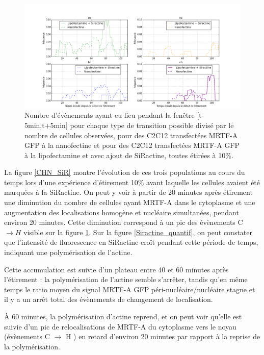 \begin{figure}
\includegraphics[scale=0.3]{Figures/Et10_transloc_Siractine.png} 
\caption{Nombre d'évènements ayant eu lieu pendant la fenêtre [t-5min,t+5min] pour chaque type de transition possible divisé par le nombre de cellules observées, pour des C2C12 transfectées MRTF-A GFP à la nanofectine et pour des C2C12 transfectées MRTF-A GFP à la lipofectamine et avec ajout de SiRactine, toutes étirées à 10\%. \label{transloc_Sir}}
\end{figure}



La figure \ref{CHN_SiR} montre l'évolution de ces trois populations au cours du temps lors d'une expérience d'étirement 10\% avant laquelle les cellules avaient été marquées à la SiRactine. 
On peut y voir à partir de 20 minutes après étirement une diminution du nombre de cellules ayant MRTF-A dans le cytoplasme et une augmentation des localisations homogène et nucléaire simultanées, pendant environ 20 minutes. 
Cette diminution correspond à un pic des évènements C $\rightarrow H$ visible sur la figure \ref{transloc_Sir}. 
Sur la figure \ref{Siractine_quantif}, on peut constater que l'intensité de fluorescence en SiRactine croît pendant cette période de temps, indiquant une polymérisation de l'actine. 

Cette accumulation est suivie d'un plateau entre 40 et 60 minutes après l'étirement : la polymérisation de l'actine semble s'arrêter, tandis qu'en même temps le ratio moyen du signal MRTF-A GFP péri-nucléaire/nucléaire stagne et il y a un arrêt total des évènements de changement de localisation. 

À 60 minutes, la polymérisation d'actine reprend, et on peut voir qu'elle est suivie d'un pic de relocalisations de MRTF-A du cytoplasme vers le noyau (évènements C $\rightarrow$ H ) en retard d'environ 20 minutes par rapport à la reprise de la polymérisation. 

